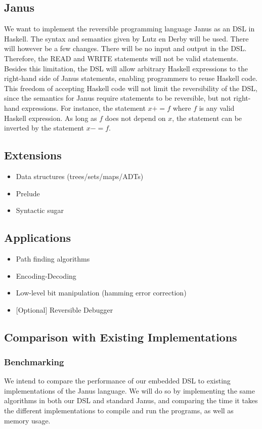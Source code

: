 \documentclass[12pt,a4paper]{article}
\begin{document}
	\subsection{Janus}
	We want to implement the reversible programming language Janus as an DSL in Haskell. The syntax and semantics given by Lutz en Derby \cite{r:lutz-derby1982} will be used. There will however be a few changes. There will be no input and output in the DSL. Therefore, the READ and WRITE statements will not be valid statements. Besides this limitation, the DSL will allow arbitrary Haskell expressions to the right-hand side of Janus statements, enabling programmers to reuse Haskell code. This freedom of accepting Haskell code will not limit the reversibility of the DSL, since the semantics for Janus require statements to be reversible, but not right-hand expressions. For instance, the statement $x += f$ where $f$ is any valid Haskell expression. As long as $f$ does not depend on $x$, the statement can be inverted by the statement $x -= f$.
	
	\subsection{Extensions}
	\begin{itemize}
		\item{Data structures (trees/sets/maps/ADTs)}
		\item{Prelude}
		\item{Syntactic sugar}
	\end{itemize}
	
	\subsection{Applications}
	\begin{itemize}
		\item{Path finding algorithms}
        \item{Encoding-Decoding}
        \item{Low-level bit manipulation (hamming error correction)}
        \item{[Optional] Reversible Debugger}
	\end{itemize}
	
	\subsection{Comparison with Existing Implementations}
    \subsubsection{Benchmarking}
    We intend to compare the performance of our embedded DSL to existing implementations of the Janus language. We will do so by implementing the same algorithms in both our DSL and standard Janus, and comparing the time it takes the different implementations to compile and run the programs, as well as memory usage.
\end{document}
